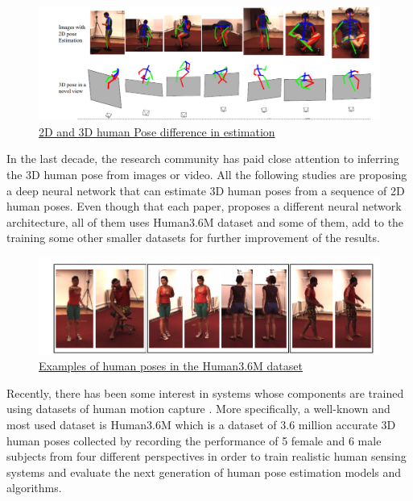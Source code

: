 \pagebreak

 \begin{figure}[h]
	\centering
	\includegraphics[width=1\textwidth]{figures/background/2D&3D.png}
	\captionsetup{labelformat=empty}
	\caption{\href{https://arxiv.org/pdf/1612.06524.pdf}
	{2D and 3D human Pose difference in estimation}}
\end{figure}

In the last decade, the research community has paid close attention to inferring the 3D human pose from images or video. All the following studies \cite{Exploiting temporal information for 3D pose estimation,3D Human Pose Estimation from Deep Multi-View 2D Pose,3D Human Pose Estimation Using Convolutional Neural Networks with 2D Pose Information,3D Human Pose Estimation = 2D Pose Estimation + Matching}are proposing a deep neural network that can estimate 3D human poses  from a sequence of 2D human poses. Even though that each paper, proposes a different neural network architecture, all of them uses Human3.6M dataset and some of them, add to the training some other smaller datasets for further improvement of the results.\\

 \begin{figure}[h]
	\centering
	\includegraphics[width=1\textwidth]{figures/background/human36M.png}
	\captionsetup{labelformat=empty}
	\caption{\href{https://vision.imar.ro/human3.6m/pami-h36m.pdf}
	{Examples of human poses in the Human3.6M dataset}}
\end{figure}

Recently, there has been some interest in systems whose components are trained using datasets of human motion capture . More specifically, a well-known and most used dataset is Human3.6M \cite{Human3.6M} which is a dataset of 3.6 million accurate 3D human poses collected by recording the performance of 5 female and 6 male subjects from four different perspectives in order to train realistic human sensing systems and evaluate the next generation of human pose estimation models and algorithms. \\



